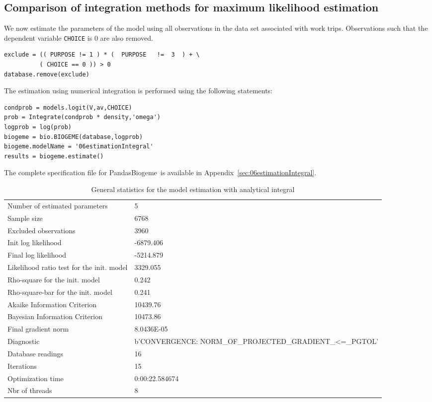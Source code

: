 \documentclass[12pt,a4paper]{article}
\newcommand{\PBIOGEME}{PandasBiogeme}
\begin{document}
\subsection{Comparison of integration methods for maximum likelihood estimation}

We now estimate the parameters of the model using all observations
in the data set associated with work trips. Observations such that the dependent variable \lstinline$CHOICE$ is $0$ are also removed.
\begin{lstlisting}
exclude = (( PURPOSE != 1 ) * (  PURPOSE   !=  3  ) + \
          ( CHOICE == 0 )) > 0
database.remove(exclude)
\end{lstlisting}
The estimation using numerical integration is performed using the following statements:
\begin{lstlisting}
condprob = models.logit(V,av,CHOICE)
prob = Integrate(condprob * density,'omega')
logprob = log(prob)
biogeme = bio.BIOGEME(database,logprob)
biogeme.modelName = '06estimationIntegral'
results = biogeme.estimate()
\end{lstlisting}
The complete specification file for \PBIOGEME\ is available in
Appendix~\ref{sec:06estimationIntegral}.

\begin{table}[htb]
  \begin{center}
\begin{tabular}{ll}
Number of estimated parameters & 5 \\
Sample size & 6768 \\
Excluded observations & 3960 \\
Init log likelihood & -6879.406 \\
Final log likelihood & -5214.879 \\
Likelihood ratio test for the init. model & 3329.055 \\
Rho-square for the init. model & 0.242 \\
Rho-square-bar for the init. model & 0.241 \\
Akaike Information Criterion & 10439.76 \\
Bayesian Information Criterion & 10473.86 \\
Final gradient norm & 8.0436E-05 \\
Diagnostic & b'CONVERGENCE: NORM\_OF\_PROJECTED\_GRADIENT\_<=\_PGTOL' \\
Database readings & 16 \\
Iterations & 15 \\
Optimization time & 0:00:22.584674 \\
Nbr of threads & 8 \\
\end{tabular}
  \end{center}
  \caption{\label{sec:estimationIntegral}General statistics for the
    model estimation with analytical integral}
\end{table}
\end{document}
